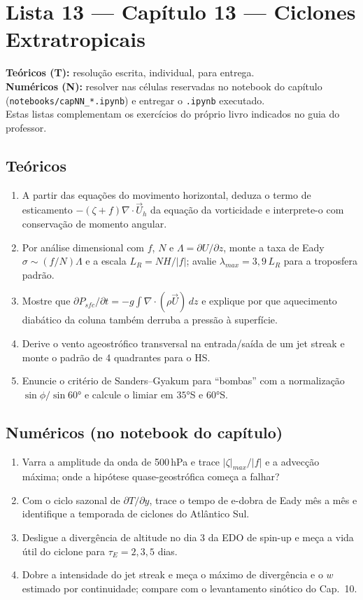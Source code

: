 \documentclass[11pt]{article}
\newcommand{\instrucoes}{%
\begin{caixalista}
\textbf{Teóricos (T):} resolução escrita, individual, para entrega.\\
\textbf{Numéricos (N):} resolver nas células reservadas no notebook do
capítulo (\texttt{notebooks/capNN\_*.ipynb}) e entregar o
\texttt{.ipynb} executado.\\
Estas listas complementam os exercícios do próprio livro indicados no
guia do professor.
\end{caixalista}}
\begin{document}
\clearpage
\section*{Lista 13 --- Capítulo 13 --- Ciclones Extratropicais}
\instrucoes

\subsection*{Teóricos}

\begin{enumerate}[label=\textbf{T\arabic*.},itemsep=4pt]
  \item A partir das equações do movimento horizontal, deduza o termo
        de esticamento $-(\zeta+f)\nabla\cdot\vec U_h$ da equação da
        vorticidade e interprete-o com conservação de momento angular.
  \item Por análise dimensional com $f$, $N$ e
        $\Lambda = \partial U/\partial z$, monte a taxa de Eady
        $\sigma \sim (f/N)\Lambda$ e a escala
        $L_R = NH/|f|$; avalie $\lambda_{max} = 3{,}9\,L_R$ para a
        troposfera padrão.
  \item Mostre que $\partial P_{sfc}/\partial t =
        -g\int\nabla\cdot(\rho\vec U)\,dz$ e explique por que
        aquecimento diabático da coluna também derruba a pressão à
        superfície.
  \item Derive o vento ageostrófico transversal na entrada/saída de um
        jet streak e monte o padrão de 4 quadrantes para o HS.
  \item Enuncie o critério de Sanders--Gyakum para ``bombas'' com a
        normalização $\sin\phi/\sin 60°$ e calcule o limiar em
        $35°$S e $60°$S.
\end{enumerate}

\subsection*{Numéricos (no notebook do capítulo)}

\begin{enumerate}[label=\textbf{N\arabic*.},itemsep=4pt]
  \item Varra a amplitude da onda de 500\,hPa e trace $|\zeta|_{max}/|f|$
        e a advecção máxima; onde a hipótese quase-geostrófica começa a
        falhar?
  \item Com o ciclo sazonal de $\partial T/\partial y$, trace o tempo
        de e-dobra de Eady mês a mês e identifique a temporada de
        ciclones do Atlântico Sul.
  \item Desligue a divergência de altitude no dia 3 da EDO de spin-up e
        meça a vida útil do ciclone para $\tau_E = 2, 3, 5$ dias.
  \item Dobre a intensidade do jet streak e meça o máximo de
        divergência e o $w$ estimado por continuidade; compare com o
        levantamento sinótico do Cap.~10.
\end{enumerate}
\end{document}
